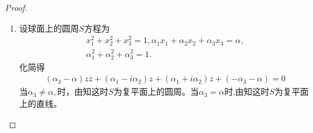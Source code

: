 \documentclass[../../main.tex]{subfiles}%
\begin{document}
\begin{proof}
\begin{enumerate}[(1)]
\begin{align*}
w'=\frac{ad-bc}{\left( cz+d \right) ^2}=\pm \frac{1}{\left( cz+d \right) ^2}\ne 0,\quad \forall z\in \mathbb{C}.
\end{align*}
当$z=\infty$时,令$g\left( z \right) =w\left( \frac{1}{z} \right)$,则
\begin{align*}
w'\left( \infty \right) =g'\left( 0 \right) =\left. \left( \frac{a\frac{1}{z}+b}{c\frac{1}{z}+d} \right)' \right| _{z=0}=\left. \left( \frac{a+bz}{c+dz} \right)' \right| _{z=0}=\left. \frac{bc-ad}{\left( c+dz \right) ^2} \right| _{z=0}=\pm \frac{1}{c^2}\ne 0.
\end{align*}
故$w'$在$\mathbb{C} _{\infty}$上恒不为$0$,因此由知$w$在$\mathbb{C} _{\infty}$上是保角的,进而保定向.综上可知,$w$是$\mathbb{C} _{\infty}$上的旋转变换.

\item 设球面上的圆周$S$方程为
\begin{gather*}
x_1^2 + x_2^2 + x_3^2 = 1,\alpha_1x_1 + \alpha_2x_2 + \alpha_3x_3 = \alpha,
\\
\alpha_1^2 + \alpha_2^2 + \alpha_3^2 = 1.
\end{gather*}
化简得
\begin{align*}
(\alpha_3 - \alpha)z\overline{z} + (\alpha_1 - i\alpha_2)z + (\alpha_1 + i\alpha_2)\overline{z} + (-\alpha_3 - \alpha) = 0
\end{align*}
当$\alpha_3 \neq \alpha,$时，由知这时$S$为复平面上的圆周。当$\alpha_3 = \alpha$时,由知这时$S$为复平面上的直线。


\end{enumerate}
\end{proof}
\end{document}
